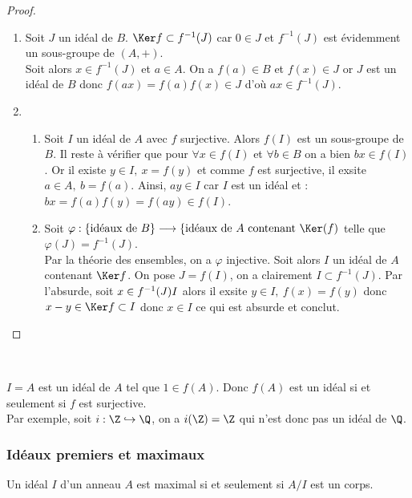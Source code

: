 \begin{proof}\ 

 \begin{enumerate}
  \item Soit $J$ un idéal de $B$. $\Ker f \subset f^{-1}(J)$ car $0 \in J$ et
$f^{-1}(J)$ est évidemment un sous-groupe de $(A,+)$. \\Soit alors $x\in
f^{-1}(J)$ et $a\in A$. On a $f(a) \in B$ et $f(x) \in J$ or $J$ est un idéal
de $B$ donc $f(ax) = f(a)f(x) \in J$ d'où $ax\in f^{-1}(J)$.
  \item \begin{enumerate}
  \item Soit $I$ un idéal de $A$ avec $f$ surjective. Alors
$f(I)$ est un sous-groupe de $B$. Il reste à vérifier que pour $\forall x \in
f(I)$ et $ \forall b\in B$ on a bien $bx \in f(I)$. Or il existe $y\in I,\
x=f(y)$ et comme $f$ est surjective, il exsite $a\in A,\ b=f(a)$. Ainsi, $ay \in
I$ car $I$ est un idéal et : $bx = f(a)f(y) = f(ay) \in f(I)$.
 \item Soit $\varphi : \{\text{idéaux de } B\} \longrightarrow \{\text{idéaux de
}A\text { contenant }\Ker (f)$ telle que $\varphi(J) = f^{-1}(J)$.\\
 Par la théorie des ensembles, on a $\varphi$ injective. Soit alors $I$ un
idéal de $A$ contenant $\Ker f$. On pose $J = f(I)$, on a clairement $I \subset
f^{-1}(J)$. Par l'absurde, soit $x\in f^{-1}(J)\- I$ alors il
exsite $y\in I,\ f(x)=f(y)$ donc $x-y \in \Ker f \subset I$ donc $x\in I$ ce
qui est absurde et conclut.
 \end{enumerate} \end{enumerate}
\end{proof}

\begin{example}[Exemple]\

$I=A$ est un idéal de $A$ tel que $1\in f(A)$. Donc $f(A)$ est un idéal si et
seulement si $f$ est surjective. \\ Par exemple, soit $i : \Z \hookrightarrow
\Q$, on a $i(\Z) = \Z $ qui n'est donc pas un idéal de $\Q$.
\end{example}


\subsubsection{Idéaux premiers et maximaux}
\vspace{0.5em}

\begin{prop}
 
Un idéal $I$ d'un anneau $A$ est maximal si et seulement si $A/I$ est un corps.
\end{prop}


